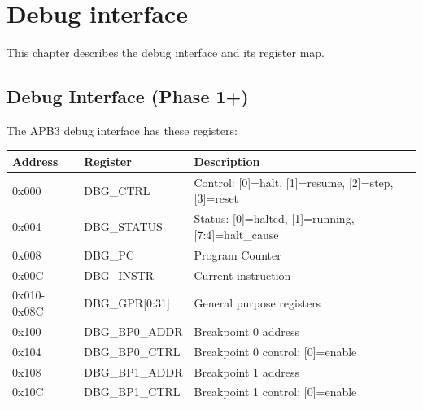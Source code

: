 \chapter{Debug interface}\label{um:ch:debug-interface}

This chapter describes the debug interface and its register map.

\section{Debug Interface (Phase 1+)}\label{um:guide:debug-interface}

The APB3 debug interface has these registers:

{
\begin{longtable}[]{@{}
  >{\raggedright\arraybackslash}p{}
  >{\raggedright\arraybackslash}p{}
  >{\raggedright\arraybackslash}p{}@{}}
\toprule\noalign{}
\begin{minipage}[b]{\linewidth}\raggedright
Address
\end{minipage} & \begin{minipage}[b]{\linewidth}\raggedright
Register
\end{minipage} & \begin{minipage}[b]{\linewidth}\raggedright
Description
\end{minipage} \\
\midrule\noalign{}
\endhead
\bottomrule\noalign{}
\endlastfoot
0x000 & DBG\_CTRL & Control: {[}0{]}=halt, {[}1{]}=resume, {[}2{]}=step,
{[}3{]}=reset \\
0x004 & DBG\_\allowbreak{}STATUS & Status: {[}0{]}=halted,
{[}1{]}=running, {[}7:4{]}=halt\_\allowbreak{}cause \\
0x008 & DBG\_PC & Program Counter \\
0x00C & DBG\_INSTR & Current instruction \\
0x010-0x08C & DBG\_\allowbreak{}GPR{[}0:31{]} & General purpose
registers \\
0x100 & DBG\_\allowbreak{}BP0\_\allowbreak{}ADDR & Breakpoint 0
address \\
0x104 & DBG\_\allowbreak{}BP0\_\allowbreak{}CTRL & Breakpoint 0 control:
{[}0{]}=enable \\
0x108 & DBG\_\allowbreak{}BP1\_\allowbreak{}ADDR & Breakpoint 1
address \\
0x10C & DBG\_\allowbreak{}BP1\_\allowbreak{}CTRL & Breakpoint 1 control:
{[}0{]}=enable \\
\end{longtable}
}

